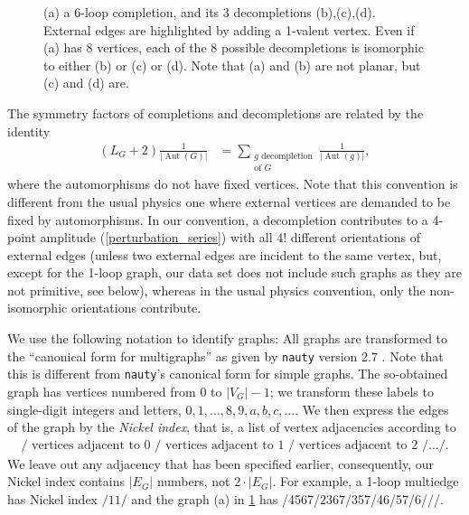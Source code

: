 \documentclass[12pt,a4paper]{article}
\newcommand{\abs}[1]{\lvert #1 \rvert}
\newcommand{\Aut}{\operatorname{Aut}}
\renewcommand{\|}{\rule[-0.4ex]{0.2ex}{1.2em}}
\begin{document}
\begin{figure}[htb]
	\caption{(a) a 6-loop completion, and its 3  decompletions (b),(c),(d). External edges are highlighted by adding a 1-valent vertex. Even if (a) has 8 vertices, each of the 8 possible decompletions is isomorphic to either (b) or  (c) or (d). Note that (a) and (b) are not planar, but (c) and (d) are.}
	\label{fig:completion_decompletion}
\end{figure}



The symmetry factors of completions and decompletions are related by the identity
\begin{align}\label{aut_decompletion}
	\left( L_G+2 \right) \frac{1}{\abs{\Aut(G)}} &=\sum_{ \substack{g \text{ decompletion}\\\text{of } G}} \frac{1}{\abs{\Aut(g)}}   ,
\end{align}
where the automorphisms do not have fixed vertices. Note that this convention is different from the usual physics one  where external vertices are demanded to be fixed by automorphisms. In our convention, a decompletion contributes to a 4-point amplitude (\cref{perturbation_series}) with all $4!$ different orientations of external edges (unless two external edges are incident to the same vertex, but, except for the 1-loop graph, our data set does not include such graphs as they are not primitive, see below), whereas in the usual physics convention, only the non-isomorphic orientations contribute. 


We use the following notation to identify graphs: All graphs are transformed to the \enquote{canonical form for multigraphs} as given by \texttt{nauty} version 2.7 \cite{mckay_practical_2014}. Note that this is different from \texttt{nauty}'s canonical form for simple graphs.  The so-obtained graph has vertices numbered from $0$ to $\abs{V_G}-1$; we transform these labels to single-digit integers and letters, $0,1,\ldots,8,9,a,b,c,\ldots$. We then express the edges of the graph by the  \emph{Nickel index}\cite{nickel_compilation_1977}, that is, a list of vertex adjacencies according to
\begin{align}\label{def:nickel}
	/ \text{ vertices adjacent to 0 }/\text{ vertices adjacent to 1 }/\text{ vertices adjacent to 2 }/\ldots/.
\end{align}
We leave out any adjacency that has been specified earlier, consequently, our Nickel index contains $\abs{E_G}$ numbers, not $2\cdot \abs{E_G}$.
For example, a 1-loop multiedge has Nickel index $/11/$ and  the graph (a)  in \cref{fig:completion_decompletion} has  /4567/2367/357/46/57/6///.
\end{document}

